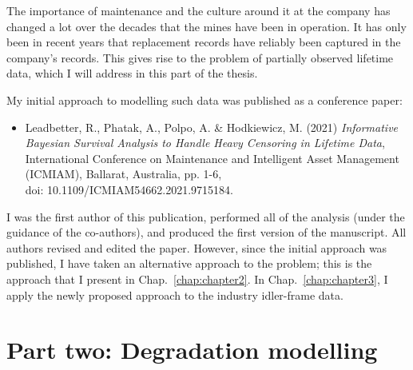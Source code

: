 \documentclass[apa,colorlinks,emptypage]{curtinThesis}
\begin{document}
The importance of maintenance and the culture around it at the company has changed a lot over the decades that the mines have been in operation. It has only been in recent years that replacement records have reliably been captured in the company's records. This gives rise to the problem of partially observed lifetime data, which I will address in this part of the thesis.

My initial approach to modelling such data was published as a conference paper:
\begin{itemize}
  \item Leadbetter, R., Phatak, A., Polpo, A. \& Hodkiewicz, M. (2021) \textit{Informative Bayesian Survival Analysis to Handle Heavy Censoring in Lifetime Data}, International Conference on Maintenance and Intelligent Asset Management (ICMIAM), Ballarat, Australia, pp. 1-6,\\ doi: 10.1109/ICMIAM54662.2021.9715184.
\end{itemize}
I was the first author of this publication, performed all of the analysis (under the guidance of the co-authors), and produced the first version of the manuscript. All authors revised and edited the paper. However, since the initial approach was published, I have taken an alternative approach to the problem; this is the approach that I present in Chap.~\ref{chap:chapter2}. In Chap.~\ref{chap:chapter3}, I apply the newly proposed approach to the industry idler-frame data.




\part{Part two: Degradation modelling}\label{part:two}
\end{document}
